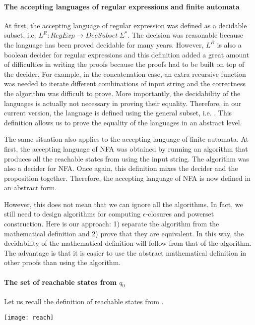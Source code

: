 \paragraph{The accepting languages of regular expressions and finite automata} At first, the
accepting language of regular expression was defined as a decidable
subset, i.e. \(L^R : RegExp \to DecSubset\ \Sigma^*\). The decision
was reasonable because the language has been proved decidable for many
years. However, \(L^R\) is also a boolean decider for regular
expressions and this definition added a great amount of
difficulties in writing the proofs because the proofs had to be built
on top of the decider. For example, in the concatenation case, an extra recursive
function was needed to iterate different combinations of input
string and the correctness the algorithm was difficult to
prove. More importantly, the decidability of the languages is actually not
necessary in proving their equality. Therefore, in our current version, the language is defined using the general subset, i.e. . This definition allows us to prove the equality of the languages
in an abstract level. 

\par The same situation also applies to the accepting language of finite automata. At first, the
accepting language of NFA was obtained by running an algorithm that
produces all the reachable states from \mb{q_0} using the input
string. The algorithm was also a decider for NFA. Once again, this
definition mixes the decider and the proposition together. Therefore,
the accepting language of NFA is now defined in an abstract form. 

\par However, this does not mean that we can ignore all the algorithms. In
fact, we still need to design algorithms for computing \(\epsilon\)-closures and
powerset construction. Here is our approach: 1) separate the algorithm from the
mathematical definition and 2) prove that they are equivalent. In this
way, the decidability of the mathematical definition will follow from that
of the algorithm. The advantage is that it is easier to use the
abstract mathematical definition in other proofs than using the algorithm. 

\paragraph{The set of reachable states from \(q_0\)} Let us recall the
definition of reachable states from \mb{q_0}. 
\begin{center} \texttt{[image: reach]} \end{center}

